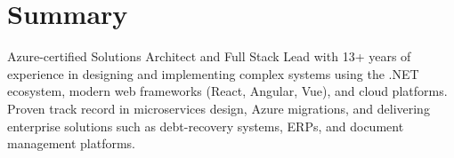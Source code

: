 \documentclass[12pt]{article}
\begin{document}
\section*{Summary} %
\small{Azure-certified Solutions Architect and Full Stack Lead with 13+ years of experience in designing and implementing complex systems using the .NET ecosystem, modern web frameworks (React, Angular, Vue), and cloud platforms. Proven track record in microservices design, Azure migrations, and delivering enterprise solutions such as debt-recovery systems, ERPs, and document management platforms.}
\vspace{-10pt}
\end{document}
